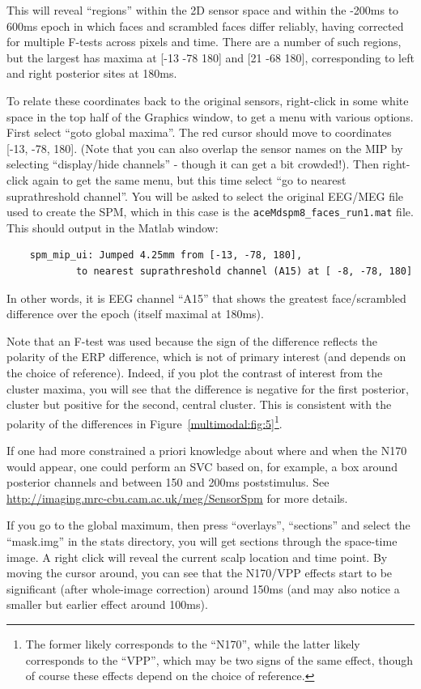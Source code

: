 This will reveal ``regions'' within the 2D sensor space and within the -200ms to 600ms epoch in which faces and scrambled faces differ reliably, having corrected for multiple F-tests across pixels and time. There are a number of such regions, but the largest has maxima at [-13 -78 180] and [21 -68 180], corresponding to left and right posterior sites at 180ms. 

To relate these coordinates back to the original sensors, right-click in some white space in the top half of the Graphics window, to get a menu with various options. First select ``goto global maxima''. The red cursor should move to coordinates [-13, -78, 180]. (Note that you can also overlap the sensor names on the MIP by selecting ``display/hide channels'' - though it can get a bit crowded!). Then right-click again to get the same menu, but this time select ``go to nearest suprathreshold channel''. You will be asked to select the original EEG/MEG file used to create the SPM, which in this case is the \texttt{aceMdspm8\_faces\_run1.mat} file. This should output in the Matlab window:

\begin{verbatim}
	spm_mip_ui:	Jumped 4.25mm from [-13, -78, 180],
			to nearest suprathreshold channel (A15) at [ -8, -78, 180]
\end{verbatim}
In other words, it is EEG channel ``A15'' that shows the greatest face/scrambled difference over the epoch (itself maximal at 180ms).

Note that an F-test was used because the sign of the difference reflects the polarity of the ERP difference, which is not of primary interest (and depends on the choice of reference). Indeed, if you plot the contrast of interest from the cluster maxima, you will see that the difference is negative for the first posterior, cluster but positive for the second, central cluster. This is consistent with the polarity of the differences in Figure~\ref{multimodal:fig:5}\footnote{The former likely corresponds to the ``N170'', while the latter likely corresponds to the ``VPP'', which may be two signs of the same effect, though of course these effects depend on the choice of reference.}.

If one had more constrained a priori knowledge about where and when the N170 would appear, one could perform an SVC based on, for example, a box around posterior channels and between 150 and 200ms poststimulus. See \url{http://imaging.mrc-cbu.cam.ac.uk/meg/SensorSpm} for more details.

If you go to the global maximum, then press ``overlays'', ``sections'' and select the ``mask.img'' in the stats directory, you will get sections through the space-time image. A right click will reveal the current scalp location and time point. By moving the cursor around, you can see that the N170/VPP effects start to be significant (after whole-image correction) around 150ms (and may also notice a smaller but earlier effect around 100ms).

